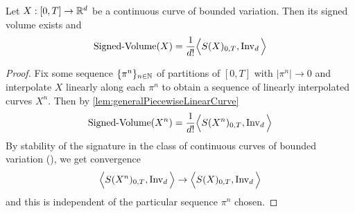 \begin{theorem}
	Let $X: [0,T] \to \mathbb{R}^d$ be a continuous curve of bounded variation.
	Then its signed volume exists and
	\begin{align*}
    \operatorname{Signed-Volume}(X)
    =
    \frac{1}{d !}
    \Big\langle S(X)_{0,T}, \operatorname{Inv}_{d} \Big\rangle
	\end{align*}
\end{theorem}
\begin{proof}
	Fix some sequence $\{\pi^n\}_{n\in\mathbb{N}}$ %
  of partitions of $[0,T]$ with $|\pi^n| \to 0$ and interpolate 	$X$ linearly along each $\pi^n$ to obtain a sequence of linearly interpolated curves $X^n$.
	Then by \autoref{lem:generalPiecewiseLinearCurve}
	\begin{align*}
    \operatorname{Signed-Volume}(X^n)
    =
    \frac{1}{d!}
    \Big\langle S(X^n)_{0,T}, \operatorname{Inv}_{d} \Big\rangle
	\end{align*}
	By stability of the signature in the class of continuous curves of bounded variation (\cite[Proposition 1.28, Proposition 2.7]{FrizVictoir}),
  we get convergence
	\begin{align*}
    \Big\langle S(X^n)_{0,T}, \operatorname{Inv}_{d} \Big\rangle
    \to
    \Big\langle S(X)_{0,T}, \operatorname{Inv}_{d} \Big\rangle
	\end{align*}
	and this is independent of the particular sequence $\pi^n$ chosen.
\end{proof}

